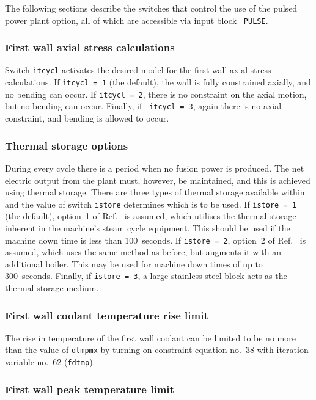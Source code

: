 The following sections describe the switches that control the use of the
pulsed power plant option, all of which are accessible via input block {\tt
PULSE}.
\setlength{\parskip}{0mm}

\subsubsection{First wall axial stress calculations}

Switch {\tt itcycl} activates the desired model for the first wall axial
stress calculations. If {\tt itcycl = 1} (the default), the wall is fully
constrained axially, and no bending can occur. If {\tt itcycl = 2}, there is
no constraint on the axial motion, but no bending can occur. Finally, if {\tt
itcycl = 3}, again there is no axial constraint, and bending is allowed to
occur.

\subsubsection{Thermal storage options}

During every cycle there is a period when no fusion power is produced. The net
electric output from the plant must, however, be maintained, and this is
achieved using thermal storage. There are three types of thermal storage
available within \PSC and the value of switch {\tt istore} determines which is
to be used. If {\tt istore = 1} (the default), option~1 of
Ref.~\cite{ELECTROWATT} is assumed, which utilises the thermal storage
inherent in the machine's steam cycle equipment. This should be used if the
machine down time is less than 100~seconds. If {\tt istore = 2}, option~2 of
Ref.~\cite{ELECTROWATT} is assumed, which uses the same method as before, but
augments it with an additional boiler. This may be used for machine down times
of up to 300~seconds. Finally, if {\tt istore = 3}, a large stainless steel
block acts as the thermal storage medium.

\subsubsection{First wall coolant temperature rise limit}

The rise in temperature of the first wall coolant can be limited to be no more
than the value of {\tt dtmpmx} by turning on constraint equation no.\ 38 with
iteration variable no.\ 62 ({\tt fdtmp}).

\subsubsection{First wall peak temperature limit}

